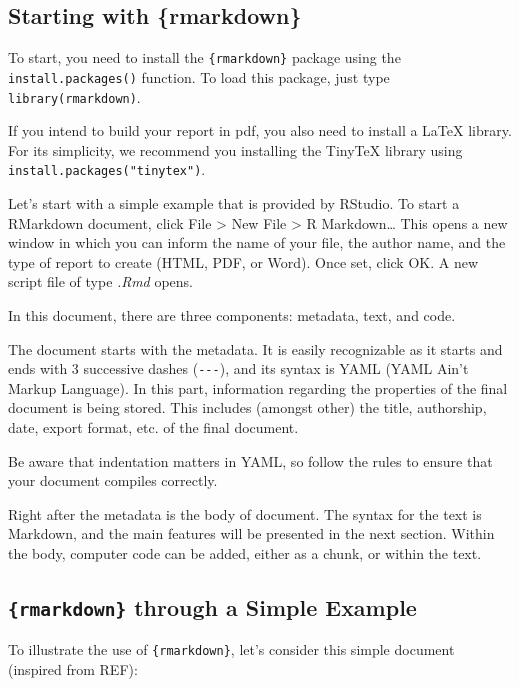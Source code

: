 \documentclass[
]{book}
\begin{document}
\hypertarget{starting-with-rmarkdown}{%
\subsection{Starting with \{rmarkdown\}}\label{starting-with-rmarkdown}}

To start, you need to install the \texttt{\{rmarkdown\}} package using the \texttt{install.packages()} function.
To load this package, just type \texttt{library(rmarkdown)}.

If you intend to build your report in pdf, you also need to install a LaTeX library. For its simplicity, we recommend you installing the TinyTeX library using \texttt{install.packages("tinytex")}.

Let's start with a simple example that is provided by RStudio. To start a RMarkdown document, click File \textgreater{} New File \textgreater{} R Markdown\ldots{}
This opens a new window in which you can inform the name of your file, the author name, and the type of report to create (HTML, PDF, or Word). Once set, click OK. A new script file of type \emph{.Rmd} opens.

In this document, there are three components: metadata, text, and code.

The document starts with the metadata. It is easily recognizable as it starts and ends with 3 successive dashes (\texttt{-\/-\/-}), and its syntax is YAML (YAML Ain't Markup Language). In this part, information regarding the properties of the final document is being stored. This includes (amongst other) the title, authorship, date, export format, etc. of the final document.

Be aware that indentation matters in YAML, so follow the rules to ensure that your document compiles correctly.

Right after the metadata is the body of document. The syntax for the text is Markdown, and the main features will be presented in the next section. Within the body, computer code can be added, either as a chunk, or within the text.

\hypertarget{rmarkdown-through-a-simple-example}{%
\subsection{\texorpdfstring{\texttt{\{rmarkdown\}} through a Simple Example}{\{rmarkdown\} through a Simple Example}}\label{rmarkdown-through-a-simple-example}}

To illustrate the use of \texttt{\{rmarkdown\}}, let's consider this simple document (inspired from REF):
\end{document}
